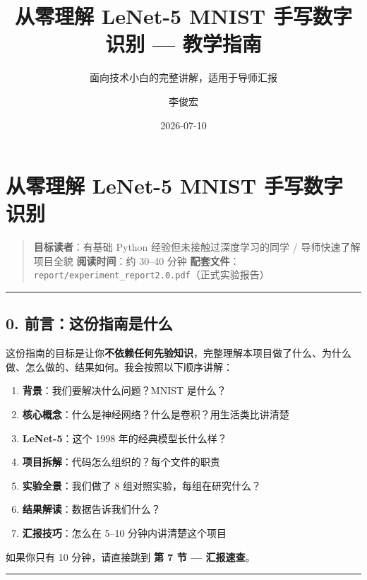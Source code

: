 \documentclass[
  11pt,
]{ctexart}
\title{从零理解 LeNet-5 MNIST 手写数字识别 — 教学指南}
\subtitle{面向技术小白的完整讲解，适用于导师汇报}
\author{李俊宏}
\date{2026-07-10}
\providecommand{\tightlist}{%
  \setlength{\itemsep}{0pt}\setlength{\parskip}{0pt}}
\begin{document}
\maketitle

{
\setcounter{tocdepth}{2}
\tableofcontents
}
\section{从零理解 LeNet-5 MNIST
手写数字识别}\label{ux4eceux96f6ux7406ux89e3-lenet-5-mnist-ux624bux5199ux6570ux5b57ux8bc6ux522b}

\begin{quote}
\textbf{目标读者}：有基础 Python 经验但未接触过深度学习的同学 /
导师快速了解项目全貌 \textbf{阅读时间}：约 30–40 分钟
\textbf{配套文件}：\texttt{report/experiment\_report2.0.pdf}（正式实验报告）
\end{quote}

\begin{center}\rule{0.5\linewidth}{0.5pt}\end{center}

\subsection{0.
前言：这份指南是什么}\label{ux524dux8a00ux8fd9ux4efdux6307ux5357ux662fux4ec0ux4e48}

这份指南的目标是让你\textbf{不依赖任何先验知识}，完整理解本项目做了什么、为什么做、怎么做的、结果如何。我会按照以下顺序讲解：

\begin{enumerate}
\def\labelenumi{\arabic{enumi}.}
\tightlist
\item
  \textbf{背景}：我们要解决什么问题？MNIST 是什么？
\item
  \textbf{核心概念}：什么是神经网络？什么是卷积？用生活类比讲清楚
\item
  \textbf{LeNet-5}：这个 1998 年的经典模型长什么样？
\item
  \textbf{项目拆解}：代码怎么组织的？每个文件的职责
\item
  \textbf{实验全景}：我们做了 8 组对照实验，每组在研究什么？
\item
  \textbf{结果解读}：数据告诉我们什么？
\item
  \textbf{汇报技巧}：怎么在 5–10 分钟内讲清楚这个项目
\end{enumerate}

如果你只有 10 分钟，请直接跳到 \textbf{第 7 节 — 汇报速查}。

\begin{center}\rule{0.5\linewidth}{0.5pt}\end{center}
\end{document}
